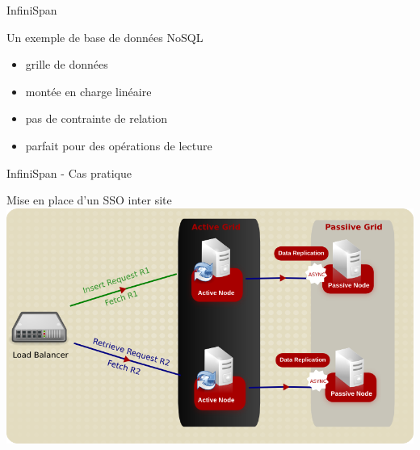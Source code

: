 {\begin{frame}{InfiniSpan}
    \begin{block}{Un exemple de base de données NoSQL}
      \begin{itemize}
        \item grille de données
        \item montée en charge linéaire
        \item pas de contrainte de relation
        \item parfait pour des opérations de lecture
      \end{itemize}
    \end{block}
  \end{frame}

  \begin{frame}{InfiniSpan - Cas pratique}
    \begin{center}
      Mise en place d'un SSO inter site
      \includegraphics[scale=0.4]{../img/infinispan-example.png}
    \end{center}
  \end{frame}

}
